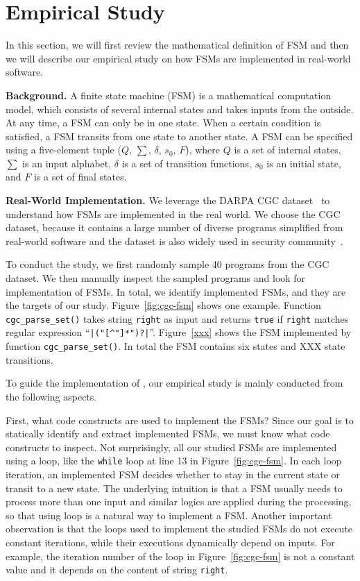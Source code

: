 \section{Empirical Study}
\label{sec:study}
In this section, we will first review the mathematical definition of FSM and then 
we will describe our empirical study on how FSMs are implemented 
in real-world software. 

\noindent\textbf{Background.}
A finite state machine (FSM) is a mathematical computation model, 
which consists of several internal states and takes inputs from the outside.
At any time, a FSM can only be in one state. 
When a certain condition is satisfied, 
a FSM transits from one state to another state. 
A FSM can be specified using a five-element tuple ($Q$, $\sum$, $\delta$, $s_0$, $F$),
where $Q$ is a set of internal states, $\sum$ is an input alphabet, 
$\delta$ is a set of transition functions,
$s_0$ is an initial state, and $F$ is a set of final states. 

\noindent\textbf{Real-World Implementation.}
We leverage the DARPA CGC dataset~\cite{CGC} to 
understand how FSMs are implemented in the real world. 
We choose the CGC dataset, because it 
contains a large number of diverse programs simplified 
from real-world software and the dataset 
is also widely used in security 
community~\cite{QSYM, Driller, VUzzer}. 


To conduct the study, we first randomly sample 
40 programs from the CGC dataset.
We then manually inspect the sampled programs and look for implementation of FSMs.
In total, we identify {\color{red}{XXX}} implemented FSMs, 
and they are the targets of our study.
Figure~\ref{fig:cgc-fsm} shows one example.
Function \texttt{cgc\_parse\_set()} takes string \texttt{right} 
as input and returns \texttt{true} if \texttt{right} matches 
regular expression ``\verb/|("[^"]*")?|/''. 
Figure~\ref{xxx} shows the FSM implemented by function \texttt{cgc\_parse\_set()}. 
In total the FSM contains six states 
and {\color{red} XXX} 
state transitions. 




To guide the implementation of \Tool{}, our empirical study 
is mainly conducted from the following aspects. 

First, what code constructs are used to implement the FSMs?
Since our goal is to statically identify and extract implemented FSMs, 
we must know what code constructs to inspect. 
Not surprisingly, all our studied FSMs are implemented using a loop, 
like the \texttt{while} loop at line 13 in Figure~\ref{fig:cgc-fsm}.  
In each loop iteration, an implemented FSM 
decides whether to stay in the current state or transit to a new state. 
The underlying intuition is that a FSM usually needs to process 
more than one input and similar logics are applied during the processing, 
so that using loop is a natural way to implement a FSM. 
Another important observation is that 
the loops used to implement the studied FSMs do not execute constant iterations,
while their executions dynamically depend on inputs. 
For example, the iteration number of the loop in Figure~\ref{fig:cgc-fsm}
is not a constant value and it depends on the content of string \texttt{right}.


